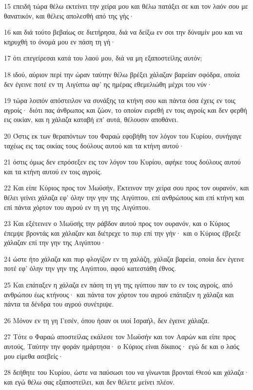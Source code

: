 \par 15 επειδή τώρα θέλω εκτείνει την χείρα μου και θέλω πατάξει σε και τον λαόν σου με θανατικόν, και θέλεις απολεσθή από της γής·
\par 16 και διά τούτο βεβαίως σε διετήρησα, διά να δείξω εν σοι την δύναμίν μου και να κηρυχθή το όνομά μου εν πάση τη γή·
\par 17 ότι επεγείρεσαι κατά του λαού μου, διά να μη εξαποστείλης αυτόν;
\par 18 ιδού, αύριον περί την ώραν ταύτην θέλω βρέξει χάλαζαν βαρείαν σφόδρα, οποία δεν έγεινε ποτέ εν τη Αιγύπτω αφ' ης ημέρας εθεμελιώθη μέχρι του νύν·
\par 19 τώρα λοιπόν απόστειλον να συνάξης τα κτήνη σου και πάντα όσα έχεις εν τοις αγροίς· διότι πας άνθρωπος και ζώον, το οποίον ευρεθή εν τοις αγροίς και δεν φερθή εις οικίαν, και η χάλαζα καταβή επ' αυτά, θέλουσιν αποθάνει.
\par 20 Όστις εκ των θεραπόντων του Φαραώ εφοβήθη τον λόγον του Κυρίου, συνήγαγε ταχέως εις τας οικίας τους δούλους αυτού και τα κτήνη αυτού·
\par 21 όστις όμως δεν επρόσεξεν εις τον λόγον του Κυρίου, αφήκε τους δούλους αυτού και τα κτήνη αυτού εν τοις αγροίς.
\par 22 Και είπε Κύριος προς τον Μωϋσήν, Έκτεινον την χείρα σου προς τον ουρανόν, και θέλει γείνει χάλαζα εφ' όλην την γην της Αιγύπτου, επί ανθρώπους και επί κτήνη και επί πάντα χόρτον του αγρού εν τη γη της Αιγύπτου.
\par 23 Και εξέτεινεν ο Μωϋσής την ράβδον αυτού προς τον ουρανόν, και ο Κύριος έπεμψε βροντάς και χάλαζαν και διέτρεχε το πυρ επί την γήν· και ο Κύριος έβρεξε χάλαζαν επί την γην της Αιγύπτου·
\par 24 ώστε ήτο χάλαζα και πυρ φλογίζον εν τη χαλάζη, χάλαζα βαρεία, οποία δεν έγεινε ποτέ εφ' όλην την γην της Αιγύπτου, αφού κατεστάθη έθνος.
\par 25 Και επάταξεν η χάλαζα εν πάση τη γη της ιγύπτου παν το εν τοις αγροίς, από ανθρώπου έως κτήνους· και πάντα τον χόρτον του αγρού επάταξεν η χάλαζα και πάντα τα δένδρα του αγρού συνέτριψε.
\par 26 Μόνον εν τη γη Γεσέν, όπου ήσαν οι υιοί Ισραήλ, δεν έγεινε χάλαζα.
\par 27 Τότε ο Φαραώ αποστείλας εκάλεσε τον Μωϋσήν και τον Ααρών και είπε προς αυτούς, Ταύτην την φοράν ημάρτησα· ο Κύριος είναι δίκαιος· εγώ δε και ο λαός μου είμεθα ασεβείς·
\par 28 δεήθητε του Κυρίου, ώστε να παύσωσι του να γίνωνται βρονταί Θεού και χάλαζα· και εγώ θέλω σας εξαποστείλει, και δεν θέλετε μείνει πλέον.
